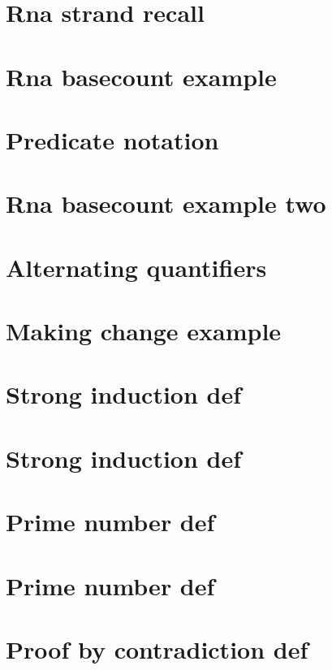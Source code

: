 \section*{Rna strand recall}

\vfill
\section*{Rna basecount example}

\vfill
\section*{Predicate notation}

\vfill
\section*{Rna basecount example two}

\vfill
\section*{Alternating quantifiers}

\vfill
\section*{Making change example}

\vfill
\section*{Strong induction def}

\vfill
\section*{Strong induction def}

\vfill
\section*{Prime number def}

\vfill
\section*{Prime number def}

\vfill
\section*{Proof by contradiction def}

\vfill
